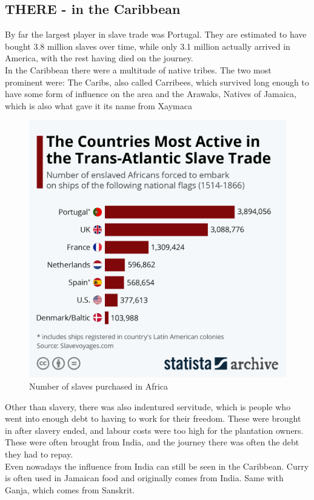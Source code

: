 \documentclass{article}
\begin{document}
	\subsection{THERE - in the Caribbean}
	By far the largest player in slave trade was Portugal. They are estimated to have bought 3.8 million slaves over time, while only 3.1 million actually arrived in America, with the rest having died on the journey. \\
	In the Caribbean there were a multitude of native tribes. The two most prominent were: The Caribs, also called Carribees, which survived long enough to have some form of influence on the area and the Arawaks, Natives of Jamaica, which is also what gave it its name from Xaymaca
	\begin{figure}
	\includegraphics[scale=0.2]{Images/Slave_Trade.jpeg}
	\caption{Number of slaves purchased in Africa}
	\end{figure}
	Other than slavery, there was also indentured servitude, which is people who went into enough debt to having to work for their freedom. These were brought in after slavery ended, and labour costs were too high for the plantation owners. These were often brought from India, and the journey there was often the debt they had to repay. \\
	Even nowadays the influence from India can still be seen in the Caribbean. Curry is often used in Jamaican food and originally comes from India. Same with Ganja, which comes from Sanskrit. \\
\end{document}
